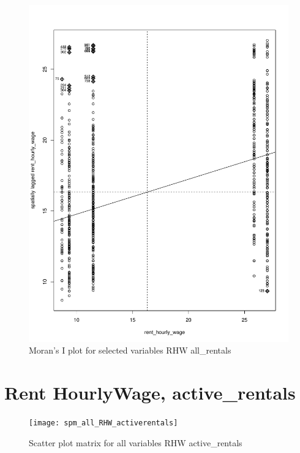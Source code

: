 \documentclass[10pt, letterpaper]{amsart}
\begin{document}
\begin{figure}[H]
  \caption{Moran's I plot for selected variables RHW all\_rentals}
  \includegraphics[scale=0.6]{Moran_RHW_allrentals}
\end{figure}

\newpage
\section{Rent HourlyWage, active\_rentals}

\begin{figure}[H]
  \caption{Scatter plot matrix for all variables RHW active\_rentals}
  \texttt{[image: spm\_all\_RHW\_activerentals]}
\end{figure}
\end{document}
